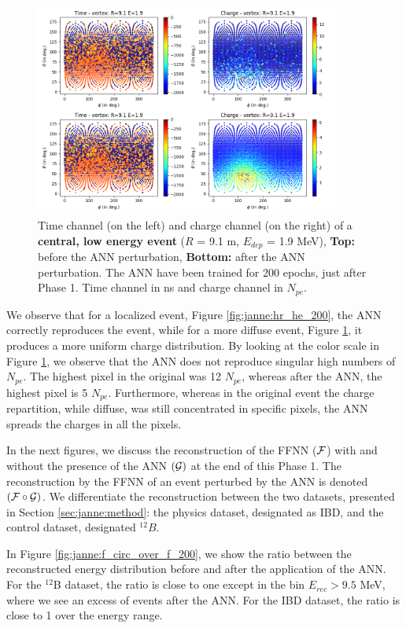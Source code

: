 \documentclass[../main.tex]{subfiles}
\begin{document}
\begin{figure}[!ht]
  \centering
  \includegraphics[height=7cm]{images/janne/events/lr_le_200.png}
  \caption{Time channel (on the left) and charge channel (on the right) of a \textbf{central, low energy event} ($R$ = 9.1 m, $E_{dep}$ = 1.9 MeV), \textbf{Top:} before the ANN perturbation, \textbf{Bottom:} after the ANN perturbation. The ANN have been trained for 200 epochs, just after Phase 1. Time channel in ns and charge channel in $N_{pe}$.}
  \label{fig:janne:lr_le_200}
\end{figure}

We observe that for a localized event, Figure \ref{fig:janne:hr_he_200}, the ANN correctly reproduces the event, while for a more diffuse event, Figure \ref{fig:janne:lr_le_200}, it produces a more uniform charge distribution. By looking at the color scale in Figure \ref{fig:janne:lr_le_200}, we observe that the ANN does not reproduce singular high numbers of $N_{pe}$. The highest pixel in the original was 12 $N_{pe}$, whereas after the ANN, the highest pixel is 5 $N_{pe}$. Furthermore, whereas in the original event the charge repartition, while diffuse, was still concentrated in specific pixels, the ANN spreads the charges in all the pixels.

In the next figures, we discuss the reconstruction of the FFNN (${\cal F}$) with and without the presence of the ANN $({\cal G})$ at the end of this Phase 1. The reconstruction by the FFNN of an event perturbed by the ANN is denoted $({\cal F} \circ {\cal G})$. We differentiate the reconstruction between the two datasets, presented in Section \ref{sec:janne:method}: the physics dataset, designated as IBD, and the control dataset, designated $^{12}B$.

In Figure \ref{fig:janne:f_circ_over_f_200}, we show the ratio between the reconstructed energy distribution before and after the application of the ANN. For the $^{12}$B dataset, the ratio is close to one except in the bin $E_{rec} > 9.5$ MeV, where we see an excess of events after the ANN. For the IBD dataset, the ratio is close to 1 over the energy range.
\end{document}
